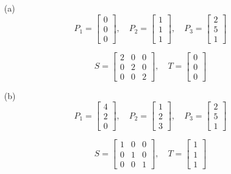 \begin{enumerate}
    \item[(a)] 
    \[
    P_1 = \begin{bmatrix} 0 \\ 0 \\ 0  \end{bmatrix}, 
    \quad P_2 = \begin{bmatrix} 1 \\ 1 \\ 1 \end{bmatrix}, 
    \quad P_3 = \begin{bmatrix} 2 \\ 5 \\ 1  \end{bmatrix}
    \]

    \[
    S = \begin{bmatrix} 2 & 0 & 0 \\ 0 & 2 & 0 \\ 0 & 0 & 2 \end{bmatrix}, 
    \quad T = \begin{bmatrix} 0 \\ 0 \\ 0 \end{bmatrix}
    \]

    \item[(b)] 
    \[
    P_1 = \begin{bmatrix} 4 \\ 2 \\ 0  \end{bmatrix}, 
    \quad P_2 = \begin{bmatrix} 1 \\ 2 \\ 3  \end{bmatrix}, 
    \quad P_3 = \begin{bmatrix} 2 \\ 5 \\ 1  \end{bmatrix}
    \]

    \[
    S = \begin{bmatrix} 1 & 0 & 0 \\ 0 & 1 & 0 \\ 0 & 0 & 1 \end{bmatrix}, 
    \quad T = \begin{bmatrix} 1 \\ 1 \\ 1 \end{bmatrix}
    \]


\end{enumerate}
